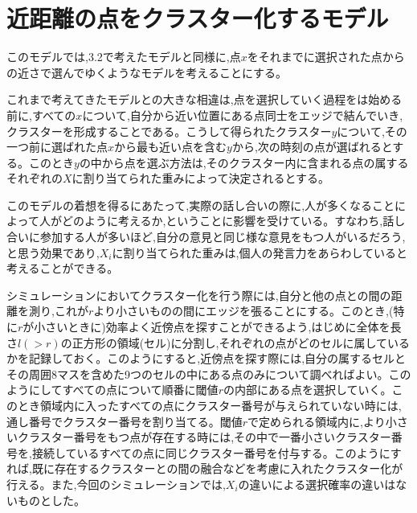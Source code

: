 \section{近距離の点をクラスター化するモデル}

このモデルでは,3.2で考えたモデルと同様に,点$x$をそれまでに選択された点からの近さで選んでゆくようなモデルを考えることにする。

これまで考えてきたモデルとの大きな相違は,点を選択していく過程をは始める前に,すべての$x$について,自分から近い位置にある点同士をエッジで結んでいき,クラスターを形成することである。こうして得られたクラスター$y$について,その一つ前に選ばれた点$x$から最も近い点を含む$y$から,次の時刻の点が選ばれるとする。このとき$y$の中から点を選ぶ方法は,そのクラスター内に含まれる点の属するそれぞれの$X$に割り当てられた重みによって決定されるとする。

このモデルの着想を得るにあたって,実際の話し合いの際に,人が多くなることによって人がどのように考えるか,ということに影響を受けている。すなわち,話し合いに参加する人が多いほど,自分の意見と同じ様な意見をもつ人がいるだろう,と思う効果であり,$X_{i}$に割り当てられた重みは,個人の発言力をあらわしていると考えることができる。

シミュレーションにおいてクラスター化を行う際には,自分と他の点との間の距離を測り,これが$r$より小さいものの間にエッジを張ることにする。このとき,(特に$r$が小さいときに)効率よく近傍点を探すことができるよう,はじめに全体を長さ$l(>r)$の正方形の領域(セル)に分割し,それぞれの点がどのセルに属しているかを記録しておく。このようにすると,近傍点を探す際には,自分の属するセルとその周囲8マスを含めた9つのセルの中にある点のみについて調べればよい。このようにしてすべての点について順番に閾値$r$の内部にある点を選択していく。このとき領域内に入ったすべての点にクラスター番号が与えられていない時には,通し番号でクラスター番号を割り当てる。閾値$r$で定められる領域内に,より小さいクラスター番号をもつ点が存在する時には,その中で一番小さいクラスター番号を,接続しているすべての点に同じクラスター番号を付与する。このようにすれば,既に存在するクラスターとの間の融合などを考慮に入れたクラスター化が行える。また,今回のシミュレーションでは,$X_{i}$の違いによる選択確率の違いはないものとした。


